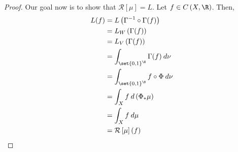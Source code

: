 \documentclass[10pt]{mypackage}
\begin{document}
\begin{proof}
  Our goal now is to show that $ \mathcal{R}\left[ \mu \right] = L $. Let $f\in C\left( X,\R \right)$. Then,
  \begin{align*}
    L(f) &= L\left( \Gamma^{-1}\circ \Gamma(f) \right)\\
         &= L_W\left( \Gamma(f) \right)\\
         &= L_V\left( \Gamma(f) \right)\\
         &= \int_{\set{0,1}^{\N}}^{} \Gamma(f)\:d\nu\\
         &= \int_{\set{0,1}^{\N}}^{} f\circ\Phi\:d\nu\\
         &= \int_{X}^{} f\:d\left( \Phi_{\ast}\mu \right)\\
         &= \int_{X}^{} f\:d\mu\\
         &= \mathcal{R}\left[ \mu \right](f)
  \end{align*}
\end{proof}
\end{document}
